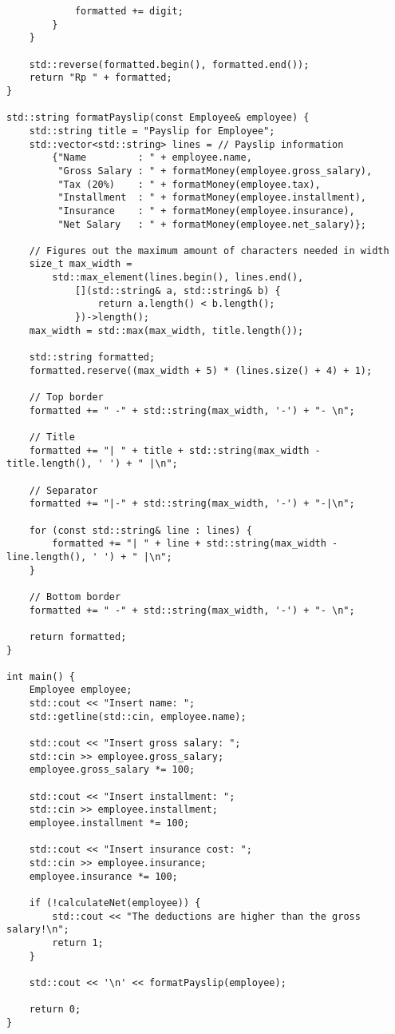 \documentclass[12pt]{article}
\begin{document}
\begin{verbatim}
            formatted += digit;
        }
    }

    std::reverse(formatted.begin(), formatted.end());
    return "Rp " + formatted;
}

std::string formatPayslip(const Employee& employee) {
    std::string title = "Payslip for Employee";
    std::vector<std::string> lines = // Payslip information
        {"Name         : " + employee.name,
         "Gross Salary : " + formatMoney(employee.gross_salary),
         "Tax (20%)    : " + formatMoney(employee.tax),
         "Installment  : " + formatMoney(employee.installment),
         "Insurance    : " + formatMoney(employee.insurance),
         "Net Salary   : " + formatMoney(employee.net_salary)};

    // Figures out the maximum amount of characters needed in width
    size_t max_width =
        std::max_element(lines.begin(), lines.end(),
            [](std::string& a, std::string& b) {
                return a.length() < b.length();
            })->length();
    max_width = std::max(max_width, title.length());

    std::string formatted;
    formatted.reserve((max_width + 5) * (lines.size() + 4) + 1);

    // Top border
    formatted += " -" + std::string(max_width, '-') + "- \n";

    // Title
    formatted += "| " + title + std::string(max_width - title.length(), ' ') + " |\n";

    // Separator
    formatted += "|-" + std::string(max_width, '-') + "-|\n";

    for (const std::string& line : lines) {
        formatted += "| " + line + std::string(max_width - line.length(), ' ') + " |\n";
    }

    // Bottom border
    formatted += " -" + std::string(max_width, '-') + "- \n";

    return formatted;
}

int main() {
    Employee employee;
    std::cout << "Insert name: ";
    std::getline(std::cin, employee.name);

    std::cout << "Insert gross salary: ";
    std::cin >> employee.gross_salary;
    employee.gross_salary *= 100;

    std::cout << "Insert installment: ";
    std::cin >> employee.installment;
    employee.installment *= 100;

    std::cout << "Insert insurance cost: ";
    std::cin >> employee.insurance;
    employee.insurance *= 100;

    if (!calculateNet(employee)) {
        std::cout << "The deductions are higher than the gross salary!\n";
        return 1;
    }

    std::cout << '\n' << formatPayslip(employee);

    return 0;
}
\end{verbatim}
\end{document}
